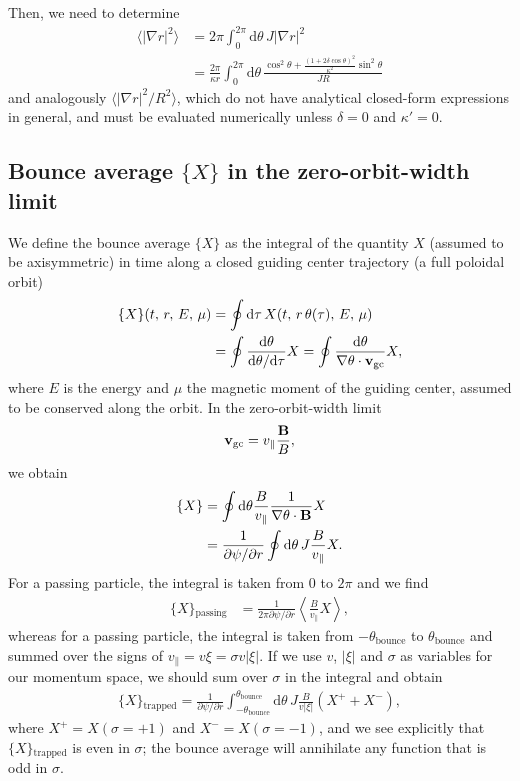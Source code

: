 \documentclass[11pt,a4paper]{article}
\newcommand{\rd}{\ensuremath{\mathrm{d}}}
\newcommand{\sub}[1]{\ensuremath{_{\text{#1}}}}
\renewcommand{\b}[1]{\ensuremath{ {\bf #1 } }}
\begin{document}
Then, we need to determine
\begin{align}
\langle |\nabla r |^2 \rangle &= 2\pi \int_0^{2\pi} \rd \theta \,J|\nabla r|^2 \nonumber \\
&= \frac{2\pi}{\kappa r} \int_0^{2\pi} \rd \theta \, \frac{\cos^2\theta + \frac{(1+2\delta\cos\theta)^2}{\kappa^2}\sin^2\theta}{JR}
\end{align}
and analogously $\langle |\nabla r|^2 /R^2\rangle$, which do not have analytical closed-form expressions in general, and must be evaluated numerically unless $\delta = 0$ and $\kappa' = 0$.


\subsection{Bounce average $\{X\}$ in the zero-orbit-width limit}
We define the bounce average $\{X\}$ as the integral of the quantity $X$ (assumed to be axisymmetric) in time along a closed guiding center trajectory (a full poloidal orbit) 
\begin{align}
\{X\}(t,\,r,\,E,\,\mu) &= \oint \rd \tau \, X(t,\,r\,\theta(\tau),\,E,\,\mu) \nonumber \\
&= \oint \frac{\rd \theta}{\rd \theta/\rd \tau} X = \oint \frac{\rd \theta}{\nabla \theta \cdot \b{v}\sub{gc}} X,
\end{align}
where $E$ is the energy and $\mu$ the magnetic moment of the guiding center, assumed to be conserved along the orbit. In the zero-orbit-width limit 
\begin{align}
\b{v}\sub{gc} = v_\parallel \frac{\b{B}}{B},
\end{align}
we obtain
\begin{align}
\{X\} &= \oint \rd \theta \frac{B}{v_\parallel} \frac{1}{\nabla\theta\cdot\b{B}} X \nonumber \\
&= \frac{1}{\partial \psi/\partial r} \oint \rd \theta \,J \frac{B}{v_\parallel}X.
\end{align}
For a passing particle, the integral is taken from $0$ to $2\pi$ and we find
\begin{align}
\{ X \}\sub{passing} &= \frac{1}{2\pi \partial \psi/\partial r}\left \langle  \frac{B}{v_\parallel} X \right\rangle,
\end{align}
whereas for a passing particle, the integral is taken from $-\theta\sub{bounce}$ to $\theta\sub{bounce}$ and summed over the signs of $v_\parallel = v\xi = \sigma v |\xi|$. If we use $v$, $|\xi|$ and $\sigma$ as variables for our momentum space, we should sum over $\sigma$ in the integral and obtain
\begin{align}
\{ X \}\sub{trapped} = \frac{1}{\partial \psi/\partial r}\int_{-\theta\sub{bounce}}^{\theta\sub{bounce}} \rd \theta \,J\frac{B}{v|\xi|} (X^++X^-),
\end{align}
where $X^+ = X(\sigma=+1)$ and $X^- = X(\sigma=-1)$, and we see explicitly that $\{ X \}\sub{trapped}$ is even in $\sigma$; the bounce average will annihilate any function that is odd in $\sigma$.
\end{document}
